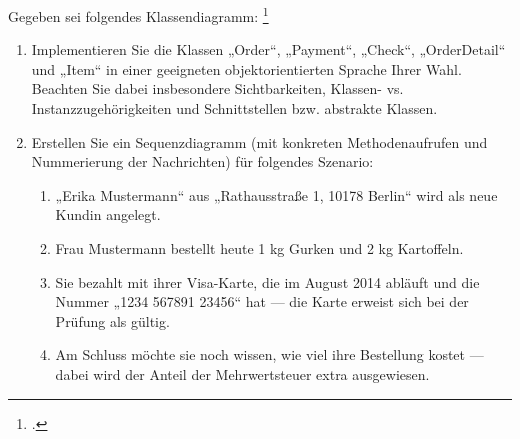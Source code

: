 \documentclass{bschlangaul-aufgabe}
\begin{document}

Gegeben sei folgendes Klassendiagramm:
\footcite{examen:46116:2013:03}

\begin{enumerate}


\item Implementieren Sie die Klassen „Order“, „Payment“, „Check“,
„OrderDetail“ und „Item“ in einer geeigneten objektorientierten Sprache
Ihrer Wahl. Beachten Sie dabei insbesondere Sichtbarkeiten, Klassen- vs.
Instanzzugehörigkeiten und Schnittstellen bzw. abstrakte
Klassen.

\begin{bAntwort}
\end{bAntwort}


\item Erstellen Sie ein Sequenzdiagramm (mit konkreten Methodenaufrufen und
Nummerierung der Nachrichten) für folgendes Szenario:

\begin{enumerate}


\item „Erika Mustermann“ aus „Rathausstraße 1, 10178 Berlin“ wird als
neue Kundin angelegt.


\item Frau Mustermann bestellt heute 1 kg Gurken und 2 kg Kartoffeln.


\item Sie bezahlt mit ihrer Visa-Karte, die im August 2014 abläuft und
die Nummer „1234 567891 23456“ hat — die Karte erweist sich bei der
Prüfung als gültig.


\item Am Schluss möchte sie noch wissen, wie viel ihre Bestellung kostet
— dabei wird der Anteil der Mehrwertsteuer extra ausgewiesen.

\end{enumerate}

\end{enumerate}
\end{document}
